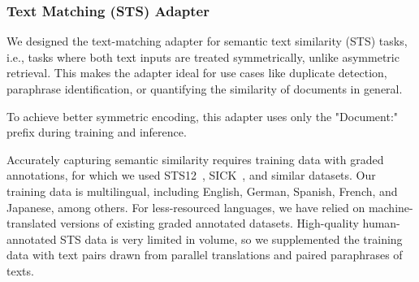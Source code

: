\documentclass[11pt]{article}
\begin{document}




\subsubsection{Text Matching (STS) Adapter}
\label{sec:text-matching}

We designed the text-matching adapter for semantic text similarity (STS) tasks, i.e., tasks where both text inputs are treated symmetrically, unlike asymmetric retrieval.
This makes the adapter ideal for use cases like duplicate detection, paraphrase identification, or quantifying the similarity of documents in general.

To achieve better symmetric encoding, this adapter uses only the "Document:" prefix during training and inference.

Accurately capturing semantic similarity requires training data with graded annotations, for which we used STS12~\cite{agirre2012semeval}, SICK~\cite{marelli-etal-2014-sick}, and similar datasets.
Our training data is multilingual, including English, German, Spanish, French, and Japanese, among others.
For less-resourced languages, we have relied on machine-translated versions of existing graded annotated datasets.
High-quality human-annotated STS data is very limited in volume, so we supplemented the training data with text pairs drawn from parallel translations and paired paraphrases of texts.
\end{document}

